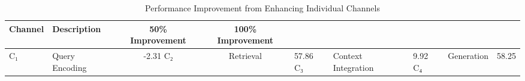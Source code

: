 \begin{table}[t]
\centering
\caption{Performance Improvement from Enhancing Individual Channels}
\label{tab:bottleneck_analysis}
\begin{tabular}{llcc}
\toprule
Channel & Description & 50\% Improvement & 100\% Improvement \\
\midrule
C₁ & Query Encoding & -2.31%
C₂ & Retrieval & 57.86%
C₃ & Context Integration & 9.92%
C₄ & Generation & 58.25%
\bottomrule
\end{tabular}
\end{table}
